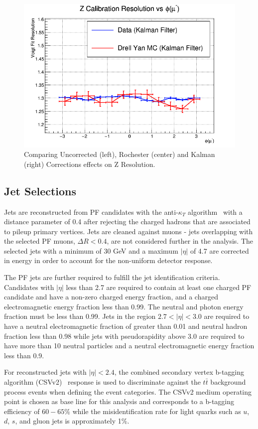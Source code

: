 \begin{figure}[!h]
  \includegraphics[width=0.32\linewidth]{figures/muon_calib/zcal_kamu_mc-data_res_phi_minus.png}
  \caption{Comparing Uncorrected (left), Rochester (center) and Kalman (right) Corrections effects on Z Resolution.}
  \label{fig:higgs_selections_zresolution}
\end{figure}

\subsection{Jet Selections}
Jets are reconstructed from PF candidates with the anti-$\kappa_{T}$ algorithm~\cite{Cacciari:2008gp} with a distance parameter of 0.4 after rejecting the charged hadrons that are associated to pileup primary vertices. Jets are cleaned against muons - jets overlapping with the selected PF muons, $\Delta R < 0.4$, are not considered further in the analysis. The selected jets with a minimum \pt of 30 GeV and a maximum $|\eta|$ of 4.7 are corrected in energy in order to account for the non-uniform detector response.

The PF jets are further required to fulfill the jet identification criteria.
Candidates with $|\eta|$ less than 2.7 are required to contain at
least one charged PF candidate and have a non-zero charged energy fraction,
and a charged electromagnetic energy fraction less than 0.99. The
neutral and photon energy fraction must be less than 0.99. Jets in
the region $2.7<|\eta|<3.0$ are required to have a neutral electromagnetic
fraction of greater than 0.01 and neutral hadron fraction less than
0.98 while jets with pseudorapidity above 3.0 are required to have more
than 10 neutral particles and a neutral electromagnetic energy fraction
less than 0.9.

For reconstructed jets with $|\eta| < 2.4$, the combined secondary vertex b-tagging algorithm (CSVv2)~\cite{Chatrchyan:2012jua} response is used to discriminate against the $t\bar{t}$ background process events when defining the event categories. The CSVv2 medium operating point is chosen as base line for this analysis and corresponds to a b-tagging efficiency of $60-65\%$ while the misidentification rate for light quarks such as $u$, $d$, $s$, and gluon jets is approximately 1\%.

